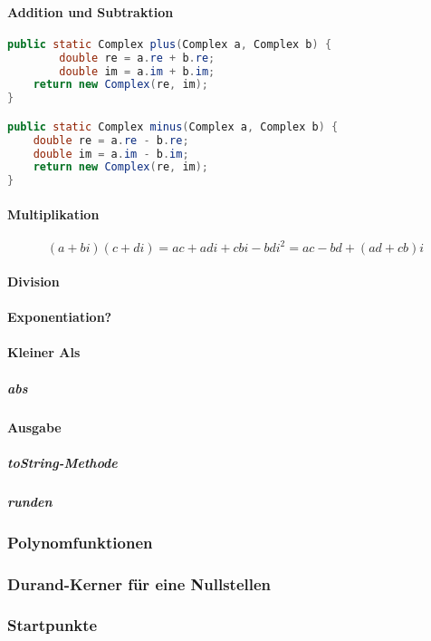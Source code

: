 \documentclass[12pt]{article}
\begin{document}
\paragraph{Addition und Subtraktion}
\begin{lstlisting}[language=Java, title={Complex.java: Z. 19-29}]
public static Complex plus(Complex a, Complex b) {
        double re = a.re + b.re;
        double im = a.im + b.im;
    return new Complex(re, im);
}

public static Complex minus(Complex a, Complex b) {
    double re = a.re - b.re;
    double im = a.im - b.im;
    return new Complex(re, im);
}
\end{lstlisting}


\paragraph{Multiplikation}
\begin{displaymath}
    (a+bi)(c+di) = ac+adi+cbi-bdi^2 = ac-bd+(ad+cb)i
\end{displaymath}
\paragraph{Division}
\paragraph{Exponentiation?}
\paragraph{Kleiner Als}


    \subparagraph{abs}

    \paragraph{Ausgabe}
    \subparagraph{toString-Methode}
    \subparagraph{runden}

    
    \subsubsection{Polynomfunktionen}
    \subsubsection{Durand-Kerner für eine Nullstellen}
    \subsubsection{Startpunkte}
\end{document}
